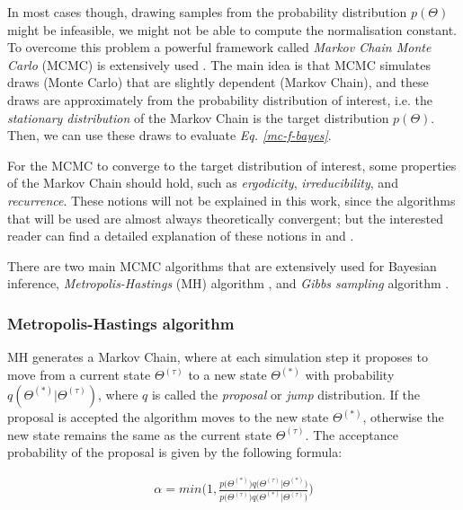 In most cases though, drawing samples from the probability distribution $p(\Theta)$ might be infeasible, \eg we might not be able to compute the normalisation constant. To overcome this problem a powerful framework called \emph{Markov Chain Monte Carlo} (MCMC) is extensively used \citep{Neal1998}. The main idea is that MCMC simulates draws (\ie Monte Carlo) that are slightly dependent (\ie Markov Chain), and these draws are approximately from the probability distribution of interest, i.e. the \emph{stationary distribution} of the Markov Chain is the target distribution $p(\Theta)$. Then, we can use these draws to evaluate \emph{Eq. \ref{mc-f-bayes}}.

For the MCMC to converge to the target distribution of interest, some properties of the Markov Chain should hold, such as \emph{ergodicity}, \emph{irreducibility}, and \emph{recurrence}. These notions will not be explained in this work, since the algorithms that will be used are almost always theoretically convergent; but the interested reader can find a detailed explanation of these notions in \citet{Robert1999} and \citet{Liu2001}.

There are two main MCMC algorithms that are extensively used for Bayesian inference, \emph{Metropolis-Hastings} (MH) algorithm \citep{Metropolis1953, Hastings1970}, and \emph{Gibbs sampling} algorithm \citep{Geman1984, Gelfand1990}. 

\subsubsection*{Metropolis-Hastings algorithm}
MH generates a Markov Chain, where at each simulation step it proposes to move from a current state $\Theta^{(\tau)}$ to a new state $\Theta^{(*)}$ with probability $q(\Theta^{(*)}|\Theta^{(\tau)})$, where $q$ is called the \emph{proposal} or \emph{jump} distribution. If the proposal is accepted the algorithm moves to the new state $\Theta^{(*)}$, otherwise the new state remains the same as the current state $\Theta^{(\tau)}$. The acceptance probability of the proposal is given by the following formula:

\begin{equation} \label{MH-f-bayes}
  \begin{aligned}
	\alpha = min\bigg(1, \frac{p\big(\Theta^{(*)}\big)q\big(\Theta^{(\tau)} | \Theta^{(*)}\big)}{p\big(\Theta^{(\tau)}\big)q\big(\Theta^{(*)}|\Theta^{(\tau)}\big)}\bigg)
  \end{aligned}
\end{equation}
\vspace*{0.1mm}

